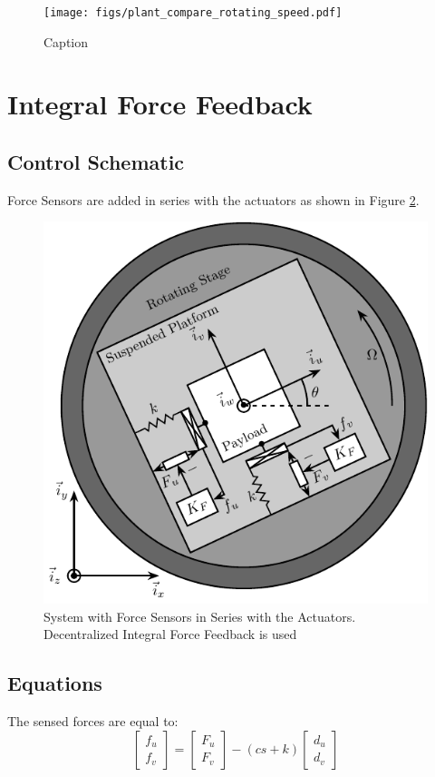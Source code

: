 \documentclass{ISMA_USD2020}
\begin{document}
\begin{figure}[htbp]
\centering
\texttt{[image: figs/plant\_compare\_rotating\_speed.pdf]}
\caption{\label{fig:plant_compare_rotating_speed}Caption}
\end{figure}

\section{Integral Force Feedback}
\label{sec:orgaf500b0}
\subsection{Control Schematic}
\label{sec:orgbd9f859}

Force Sensors are added in series with the actuators as shown in Figure \ref{fig:system_iff}.

\begin{figure}[htbp]
\centering
\includegraphics[scale=1]{figs/system_iff.pdf}
\caption{\label{fig:system_iff}System with Force Sensors in Series with the Actuators. Decentralized Integral Force Feedback is used}
\end{figure}

\subsection{Equations}
\label{sec:org48206d5}
The sensed forces are equal to:
\begin{equation}
\begin{bmatrix} f_{u} \\ f_{v} \end{bmatrix} =
\begin{bmatrix} F_u \\ F_v \end{bmatrix} - (c s + k)
\begin{bmatrix} d_u \\ d_v \end{bmatrix}
\end{equation}
\end{document}
